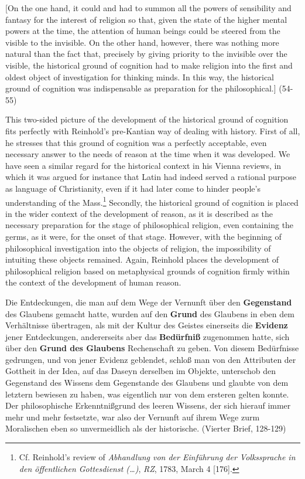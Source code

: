 [On the one hand, it could and had to summon all the powers of sensibility and fantasy for the interest of religion so that, given the state of the higher mental powers at the time, the attention of human beings could be steered from the visible to the invisible. On the other hand, however, there was nothing more natural than the fact that, precisely by giving priority to the invisible over the visible, the historical ground of cognition had to make religion into the first and oldest object of investigation for thinking minds. In this way, the historical ground of cognition was indispensable as preparation for the philosophical.] (54{-}55)

This two{-}sided picture of the development of the historical ground of cognition fits perfectly with Reinhold's pre{-}Kantian way of dealing with history. First of all, he stresses that this ground of cognition was a perfectly acceptable, even necessary answer to the needs of reason at the time when it was developed. We have seen a similar regard for the historical context in his Vienna reviews, in which it was argued for instance that Latin had indeed served a rational purpose as language of Christianity, even if it had later come to hinder people's understanding of the Mass.\footnote{ Cf. Reinhold's review of \textit{Abhandlung von der Einf\"{u}hrung der Volkssprache in den \"{o}ffentlichen Gottesdienst (\ldots )}, \textit{RZ}, 1783, March 4 [176]. } Secondly, the historical ground of cognition is placed in the wider context of the development of reason, as it is described as the necessary preparation for the stage of philosophical religion, even containing the germs, as it were, for the onset of that stage. However, with the beginning of philosophical investigation into the objects of religion, the impossibility of intuiting these objects remained. Again, Reinhold places the development of philosophical religion based on metaphysical grounds of cognition firmly within the context of the development of human reason. 

Die Entdeckungen, die man auf dem Wege der Vernunft \"{u}ber den \textbf{Gegenstand} des Glaubens gemacht hatte, wurden auf den \textbf{Grund} des Glaubens in eben dem Verh\"{a}ltnisse \"{u}bertragen, als mit der Kultur des Geistes einerseits die \textbf{Evidenz} jener Entdeckungen, andererseits aber das \textbf{Bed\"{u}rfni\ss{}} zugenommen hatte, sich \"{u}ber den \textbf{Grund des Glaubens} Rechenschaft zu geben. Von diesem Bed\"{u}rfnisse gedrungen, und von jener Evidenz geblendet, schlo\ss{} man von den Attributen der Gottheit in der Idea, auf das Daseyn derselben im Objekte, unterschob den Gegenstand des Wissens dem Gegenstande des Glaubens und glaubte von dem letztern bewiesen zu haben, was eigentlich nur von dem ersteren gelten konnte. Der philosophische Erkenntni\ss{}grund des leeren Wissens, der sich hierauf immer mehr und mehr festsetzte, war also der Vernunft auf ihrem Wege zurm Moralischen eben so unvermeidlich als der historische. (Vierter Brief, 128{-}129)

